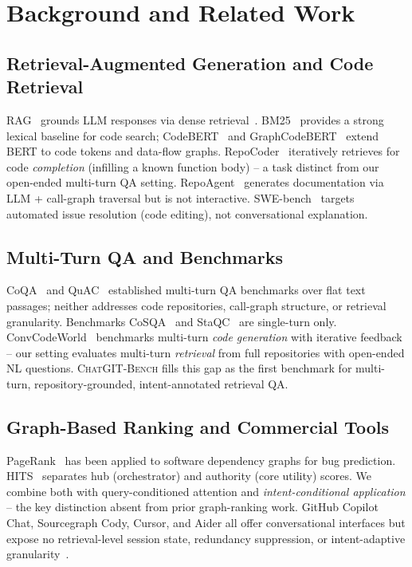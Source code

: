 \documentclass[runningheads]{llncs}
\newcommand{\conv}{\textsc{ChatGIT-Bench}\xspace}
\begin{document}
\section{Background and Related Work}
\label{sec:related}

\subsection{Retrieval-Augmented Generation and Code Retrieval}

RAG~\cite{lewis2021rag} grounds LLM responses via dense retrieval~\cite{guo2024lightrag}.
BM25~\cite{robertson2009bm25} provides a strong lexical baseline for
code search; CodeBERT~\cite{feng2020codebert} and
GraphCodeBERT~\cite{guo2021graphcodebert} extend BERT to code tokens and
data-flow graphs. RepoCoder~\cite{zhang2023repocoder} iteratively retrieves
for code \emph{completion} (infilling a known function body) -- a task
distinct from our open-ended multi-turn QA setting. RepoAgent~\cite{liu2024repoagent}
generates documentation via LLM + call-graph traversal but is not
interactive. SWE-bench~\cite{jimenez2024swebench} targets automated
issue resolution (code editing), not conversational explanation.

\subsection{Multi-Turn QA and Benchmarks}

CoQA~\cite{reddy2019coqa} and QuAC~\cite{choi2018quac} established
multi-turn QA benchmarks over flat text passages; neither addresses code
repositories, call-graph structure, or retrieval granularity.
Benchmarks CoSQA~\cite{huang2021cosqa} and StaQC~\cite{yao2018staqc}
are single-turn only. ConvCodeWorld~\cite{han2025convcodeworld} benchmarks
multi-turn \emph{code generation} with iterative feedback -- our setting
evaluates multi-turn \emph{retrieval} from full repositories with open-ended
NL questions. \conv fills this gap as the first benchmark for multi-turn,
repository-grounded, intent-annotated retrieval QA.

\subsection{Graph-Based Ranking and Commercial Tools}

PageRank~\cite{brin1998pagerank} has been applied to software dependency
graphs for bug prediction. HITS~\cite{kleinberg1999hits} separates hub
(orchestrator) and authority (core utility) scores. We combine both with
query-conditioned attention and \emph{intent-conditional application} --
the key distinction absent from prior graph-ranking work.
GitHub Copilot Chat, Sourcegraph Cody, Cursor, and Aider all offer
conversational interfaces but expose no retrieval-level session state,
redundancy suppression, or intent-adaptive granularity~\cite{githubcopilot,cody,cursor,aider}.
\end{document}
